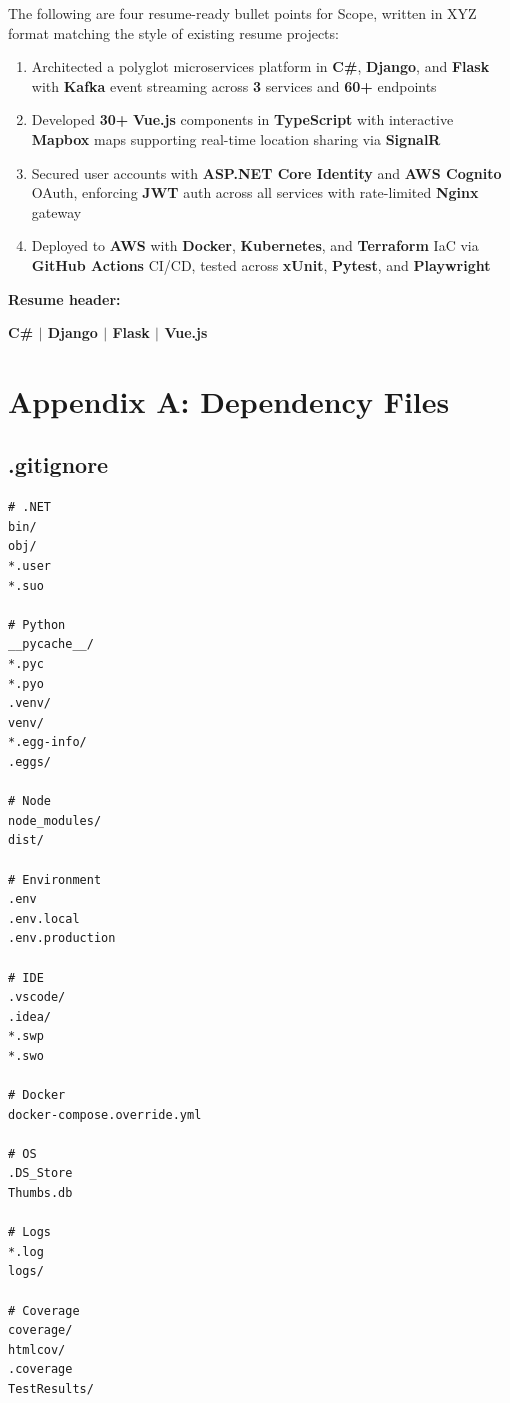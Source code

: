 \documentclass[12pt,letterpaper]{article}
\begin{document}
The following are four resume-ready bullet points for Scope, written in XYZ format matching the style of existing resume projects:

\begin{enumerate}
  \item Architected a polyglot microservices platform in \textbf{C\#}, \textbf{Django}, and \textbf{Flask} with \textbf{Kafka} event streaming across \textbf{3} services and \textbf{60+} endpoints
  \item Developed \textbf{30+} \textbf{Vue.js} components in \textbf{TypeScript} with interactive \textbf{Mapbox} maps supporting real-time location sharing via \textbf{SignalR}
  \item Secured user accounts with \textbf{ASP.NET Core Identity} and \textbf{AWS Cognito} OAuth, enforcing \textbf{JWT} auth across all services with rate-limited \textbf{Nginx} gateway
  \item Deployed to \textbf{AWS} with \textbf{Docker}, \textbf{Kubernetes}, and \textbf{Terraform} IaC via \textbf{GitHub Actions} CI/CD, tested across \textbf{xUnit}, \textbf{Pytest}, and \textbf{Playwright}
\end{enumerate}

\textbf{Resume header:}
\begin{center}
\textbf{C\# $|$ Django $|$ Flask $|$ Vue.js}
\end{center}

\newpage

\section{Appendix A: Dependency Files}

\subsection{.gitignore}
\begin{lstlisting}[style=code]
# .NET
bin/
obj/
*.user
*.suo

# Python
__pycache__/
*.pyc
*.pyo
.venv/
venv/
*.egg-info/
.eggs/

# Node
node_modules/
dist/

# Environment
.env
.env.local
.env.production

# IDE
.vscode/
.idea/
*.swp
*.swo

# Docker
docker-compose.override.yml

# OS
.DS_Store
Thumbs.db

# Logs
*.log
logs/

# Coverage
coverage/
htmlcov/
.coverage
TestResults/
\end{lstlisting}
\end{document}
